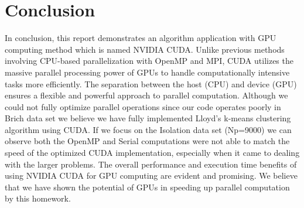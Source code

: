 \documentclass{article}
\begin{document}
\section{Conclusion}
In conclusion, this report demonstrates an algorithm application with GPU computing method which is named NVIDIA CUDA. Unlike previous methods involving CPU-based parallelization with OpenMP and MPI, CUDA utilizes the massive parallel processing power of GPUs to handle computationally intensive tasks more efficiently. The separation between the host (CPU) and device (GPU) ensures a flexible and powerful approach to parallel computation. Although we could not fully optimize parallel operations since our code operates poorly in Brich data set we believe we have fully implemented Lloyd's k-means clustering algorithm using CUDA. If we focus on the Isolation data set (Np=9000) we can observe both the OpenMP and Serial computations were not able to match the speed of the optimized CUDA implementation, especially when it came to dealing with the larger problems. The overall performance and execution time benefits of using NVIDIA CUDA for GPU computing are evident and promising. We believe that we have shown the potential of GPUs in speeding up parallel computation by this homework.
\end{document}
